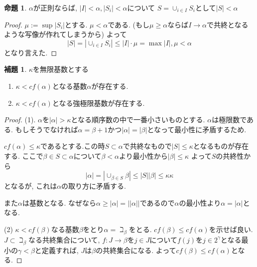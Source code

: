 \documentclass[dvipdfmx,a4paper,11pt]{article}
\theoremstyle{definition}
\newtheorem{lem}[thm]{補題}
\newtheorem{prop}[thm]{命題}
\begin{document}
 \begin{tcolorbox}
 [colback = white, colframe = green!35!black, fonttitle = \bfseries,breakable = true]
\begin{prop}
\label{prop-regular-cardinal}
$\alpha$が正則ならば, $| I | <  \alpha, |S_i| < \alpha$について
$ S = \cup_{i \in I}S_i$として$|S| < \alpha$
\end{prop}
\end{tcolorbox}
\begin{proof}
$\mu := \sup |S_{i}|$とする.
$\mu < \alpha$である.
(もし$\mu \ge \alpha$ならば$I \to \alpha$で共終となるような写像が作れてしまうから)
よって
$$
|S| =
 |\cup_{i \in I}S_i |
 \le 
 | I | \cdot {\mu}
= \max {|I|, \mu}
< \alpha
$$
となり言えた. 
\end{proof}




 \begin{tcolorbox}
 [colback = white, colframe = green!35!black, fonttitle = \bfseries,breakable = true]
\begin{lem}\cite[000E 3.7 Cofinality]{Sta}
\label{lem-cofinal}
$\kappa$を無限基数とする
\begin{enumerate}
\item $\kappa < cf(\alpha)$となる基数$\alpha$が存在する.
\item $\kappa < cf(\alpha)$となる強極限基数が存在する.
\end{enumerate}
\end{lem}
 \end{tcolorbox}
 
\begin{proof}
(1). $\alpha$を$|\alpha|>\kappa$となる順序数の中で一番小さいものとする.
$\alpha$は極限数である. もしそうでなければ$\alpha = \beta +1$かつ$|\alpha|=|\beta|$となって最小性に矛盾するため.

$cf(\alpha) \le \kappa$であるとする.この時$S \subset \alpha$で共終なもので$|S| \le \kappa$となるものが存在する.
ここで$\beta \in S \subset \alpha$について$\beta < \alpha$より最小性から$|\beta| \le \kappa$
よって$S$の共終性から
$$
|\alpha|
=
|\cup_{\beta \in S}\beta|
\le 
|S| |\beta|
\le
\kappa \kappa
$$ 
となるが, これは$\alpha$の取り方に矛盾する.

また$\alpha$は基数となる. 
なぜなら$\alpha\ge |\alpha| = || \alpha||$であるので$\alpha$の最小性より$\alpha =|\alpha| $となる. 

(2)
$\kappa < cf(\beta)$なる基数$\beta$をとり$\alpha = \beth_{\beta}$をとる.
$cf(\beta) \le cf(\alpha )$を示せば良い.
$J \subset \beth_{\beta}$なる共終集合について, $f: J \to \beta$を$j \in J$について$f(j)$を$j \in 2^{\gamma}$となる最小の$\gamma < \beta$と定義すれば, $J$は$\beta$の共終集合になる. 
よって$cf(\beta) \le cf(\alpha )$となる. 

\end{proof}
\end{document}

